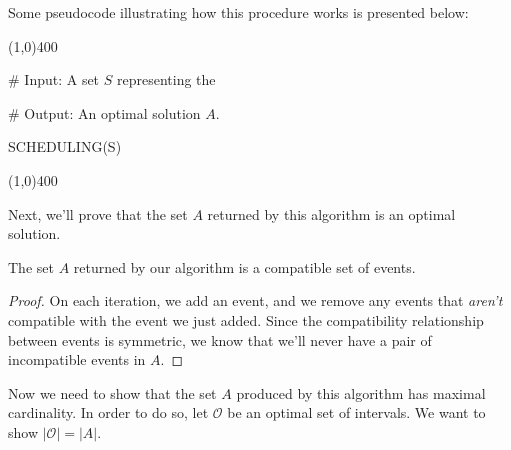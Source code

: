 Some pseudocode illustrating how this procedure works is presented below:

\vspace{1em}
\begin{center}
\line(1,0){400}
\end{center}

\begin{allintypewriter}
\# Input: A set $S$ representing the

\# Output: An optimal solution $A$.

SCHEDULING(S) 

\begin{center}
\line(1,0){400}
\end{center}
\end{allintypewriter}

Next, we'll prove that the set $A$ returned by this algorithm is an optimal solution. 


\begin{proposition}
The set $A$ returned by our algorithm is a compatible set of events.
\end{proposition}
\begin{proof}
On each iteration, we add an event, and we remove any events that \textit{aren't} compatible with the event we just added. Since the compatibility relationship between events is symmetric, we know that we'll never have a pair of incompatible events in $A$. 
\end{proof}

Now we need to show that the set $A$ produced by this algorithm has maximal cardinality. In order to do so, let $\mathcal{O}$ be an optimal set of intervals. We want to show $|\mathcal{O}| = |A|$. \\

